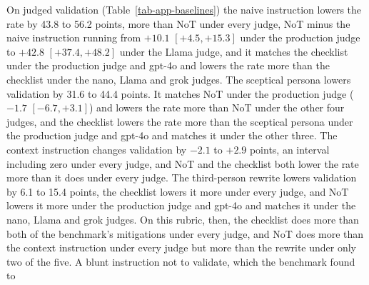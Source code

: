 On judged validation (Table~\ref{tab-app-baselines}) the naive instruction
lowers the rate by 43.8 to 56.2 points, more than NoT under every judge, NoT
minus the naive instruction running from $+10.1$ $[+4.5, +15.3]$ under the
production judge to $+42.8$ $[+37.4, +48.2]$ under the Llama judge, and it
matches the checklist under the production judge and gpt-4o and lowers the
rate more than the checklist under the nano, Llama and grok judges.
The sceptical persona lowers validation by 31.6 to 44.4 points. It matches
NoT under the production judge ($-1.7$ $[-6.7, +3.1]$) and lowers the rate
more than NoT under the other four judges, and the checklist lowers the rate
more than the sceptical persona under the production judge and gpt-4o and
matches it under the other three.
The context instruction changes validation by $-2.1$ to $+2.9$ points, an
interval including zero under every judge, and NoT and the checklist both
lower the rate more than it does under every judge. The third-person
rewrite lowers validation by 6.1 to 15.4 points, the checklist lowers it
more under every judge, and NoT lowers it more under the production judge
and gpt-4o and matches it under the nano, Llama and grok judges.
On this rubric, then, the checklist does more than both of the benchmark's
mitigations under every judge, and NoT does more than the context
instruction under every judge but more than the rewrite under only two of
the five. A blunt instruction not to validate, which the benchmark found to

